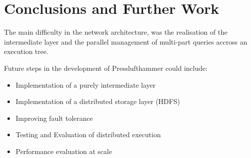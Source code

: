 \section{Conclusions and Further Work}
  The main difficulty in the network architecture, was the realisation of
  the intermediate layer and the parallel management of multi-part queries
  accross an execution tree.
  
  Future steps in the development of Presslufthammer could include:
  \begin{itemize}
    \item Implementation of a purely intermediate layer
    \item Implementation of a distributed storage layer (HDFS)
    \item Improving fault tolerance
    \item Testing and Evaluation of distributed execution
    \item Performance evaluation at scale
  \end{itemize}


